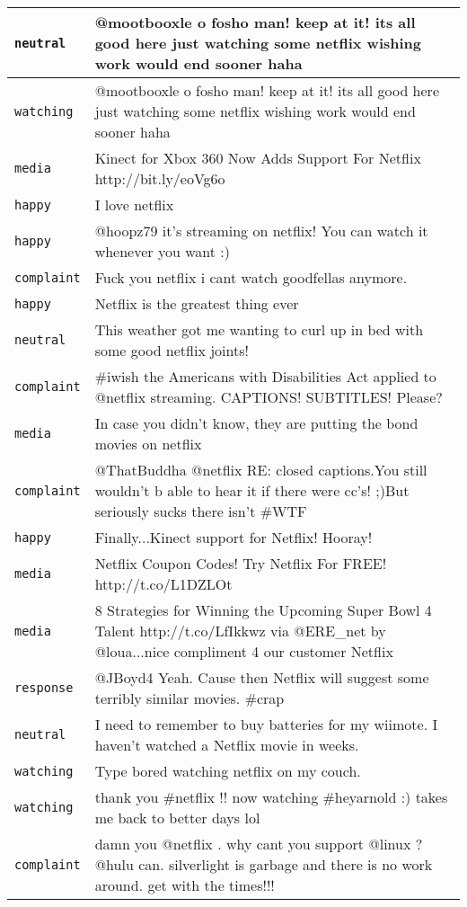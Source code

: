 \begin{center}
\begin{longtable}{|l|p{120mm}|}
         \texttt{neutral} & @mootbooxle o fosho man! keep at it! its all good here just watching some netflix wishing work would end sooner haha
      \tabularnewline\hline
         \texttt{watching} & @mootbooxle o fosho man! keep at it! its all good here just watching some netflix wishing work would end sooner haha
      \tabularnewline\hline
         \texttt{media} & Kinect for Xbox 360 Now Adds Support For Netflix http://bit.ly/eoVg6o
      \tabularnewline\hline
         \texttt{happy} & I love netflix
      \tabularnewline\hline
         \texttt{happy} & @hoopz79 it's streaming on netflix! You can watch it whenever you want :)
      \tabularnewline\hline
         \texttt{complaint} & Fuck you netflix i cant watch goodfellas anymore.
      \tabularnewline\hline
         \texttt{happy} & Netflix is the greatest thing ever
      \tabularnewline\hline
         \texttt{neutral} & This weather got me wanting to curl up in bed with some good netflix joints!
      \tabularnewline\hline
         \texttt{complaint} & \#iwish the Americans with Disabilities Act applied to @netflix streaming. CAPTIONS! SUBTITLES! Please?
      \tabularnewline\hline
         \texttt{media} & In case you didn't know, they are putting the bond movies on netflix
      \tabularnewline\hline
         \texttt{complaint} & @ThatBuddha @netflix RE: closed captions.You still wouldn't b able to hear it if there were cc's! ;)But seriously sucks there isn't \#WTF
      \tabularnewline\hline
         \texttt{happy} & Finally...Kinect support for Netflix! Hooray!
      \tabularnewline\hline
         \texttt{media} & Netflix Coupon Codes! Try Netflix For FREE! http://t.co/L1DZLOt
      \tabularnewline\hline
         \texttt{media} & 8 Strategies for Winning the Upcoming Super Bowl 4 Talent http://t.co/LfIkkwz via @ERE\_net by @loua...nice compliment 4 our customer Netflix
      \tabularnewline\hline
         \texttt{response} & @JBoyd4 Yeah. Cause then Netflix will suggest some terribly similar movies. \#crap
      \tabularnewline\hline
         \texttt{neutral} & I need to remember to buy batteries for my wiimote. I haven't watched a Netflix movie in weeks.
      \tabularnewline\hline
         \texttt{watching} & Type bored watching netflix on my couch.
      \tabularnewline\hline
         \texttt{watching} & thank you \#netflix !! now watching \#heyarnold :) takes me back to better days lol
      \tabularnewline\hline
         \texttt{complaint} & damn you @netflix . why cant you support @linux ? @hulu can. silverlight is garbage and there is no work around. get with the times!!!
      \tabularnewline\hline

\end{longtable}
\end{center}
